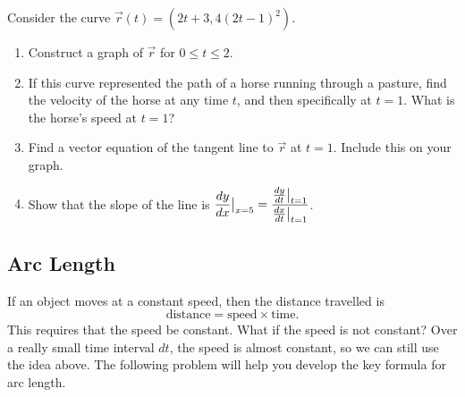 \begin{problem}
Consider the curve $\vec r(t) = (2t+3, 4(2t-1)^2)$.
\begin{enumerate}
\item Construct a graph of $\vec r$ for $0\leq t\leq 2$. 
\item If this curve represented the path of a horse running through a pasture, find the velocity of the horse at any time $t$, and then specifically at $t=1$. What is the horse's speed at $t=1$?
\item Find a vector equation of the tangent line to $\vec r$ at $t=1$.  Include this on your graph.
\item Show that the slope of the line is $\displaystyle \frac{dy}{dx}\big|_{x=5} = \frac{\frac{dy}{dt}\big|_{t=1}}{\frac{dx}{dt}\big|_{t=1}}$.
\end{enumerate} 
\end{problem}
%
%

\subsection{Arc Length}\label{arc length}
If an object moves at a constant speed, then the distance travelled is 
$$\text{distance} = \text{speed}\times\text{time}.$$
This requires that the speed be constant.  What if the speed is not constant? Over a really small time interval $dt$, the speed is almost constant, so we can still use the idea above. The following problem will help you develop the key formula for arc length.

